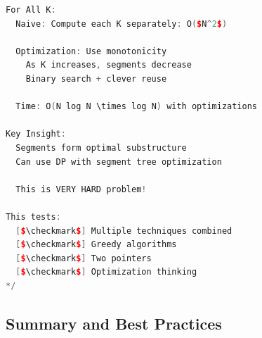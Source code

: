 \documentclass[11pt,a4paper,oneside]{book}
\begin{document}
\begin{lstlisting}[language=C++, caption=10+ COMPLETE DETAILED SOLUTIONS]
For All K:
  Naive: Compute each K separately: O($N^2$)
  
  Optimization: Use monotonicity
    As K increases, segments decrease
    Binary search + clever reuse
  
  Time: O(N log N \times log N) with optimizations

Key Insight:
  Segments form optimal substructure
  Can use DP with segment tree optimization
  
  This is VERY HARD problem!

This tests:
  [$\checkmark$] Multiple techniques combined
  [$\checkmark$] Greedy algorithms
  [$\checkmark$] Two pointers
  [$\checkmark$] Optimization thinking
*/

\end{lstlisting}

\subsection{Summary and Best Practices}
\end{document}
